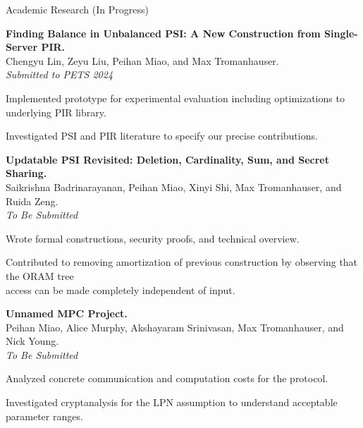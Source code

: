 \documentclass{resume} %
\begin{document}
\begin{grouping}{Academic Research \hfill (In Progress)}

\item {\bf Finding Balance in Unbalanced PSI: A New Construction from Single-Server PIR.} \\
    Chengyu Lin, Zeyu Liu, Peihan Miao, and Max Tromanhauser. \\
    {\em Submitted to PETS 2024}
    \begin{items}
        \item Implemented prototype for experimental evaluation including optimizations to underlying PIR library.
        \item Investigated PSI and PIR literature to specify our precise contributions.
    \end{items}

\item {\bf Updatable PSI Revisited: Deletion, Cardinality, Sum, and Secret Sharing. } \\
    Saikrishna Badrinarayanan, Peihan Miao, Xinyi Shi, Max Tromanhauser, and Ruida Zeng. \\
    {\em To Be Submitted} %
    \begin{items}
        \item Wrote formal constructions, security proofs, and technical overview.
        \item Contributed to removing amortization of previous construction by observing that the ORAM tree \\
            access can be made completely independent of input.
    \end{items}

\item {\bf \color{blue} Unnamed MPC Project.} \\
    Peihan Miao, Alice Murphy, Akshayaram Srinivasan, Max Tromanhauser, and Nick Young. \\
    {\em To Be Submitted} %
    \begin{items}
        \item Analyzed concrete communication and computation costs for the protocol.
        \item Investigated cryptanalysis for the LPN assumption to understand acceptable parameter ranges.
        \iffalse
        \item Streamlined PCG construction by suggesting that the primal and dual random matrices can \\
            be composed.
        \fi
    \end{items}

\end{grouping}
\end{document}
